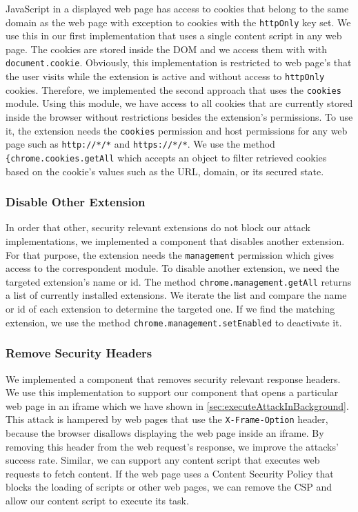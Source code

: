 	JavaScript in a displayed web page has access to cookies that belong to the same domain as the web page with exception to cookies with the \texttt{httpOnly} key set. We use this in our first implementation that uses a single content script in any web page. The cookies are stored inside the DOM and we access them with with \texttt{document.cookie}. Obviously, this implementation is restricted to web page's that the user visits while the extension is active and without access to \texttt{httpOnly} cookies. Therefore, we implemented the second approach that uses the \texttt{cookies} module. Using this module, we have access to all cookies that are currently stored inside the browser without restrictions besides the extension's permissions. To use it, the extension needs the \texttt{cookies} permission and host permissions for any web page such as \texttt{http://*/*} and \texttt{https://*/*}. We use the method \lstinline|{chrome.cookies.getAll| which accepts an object to filter retrieved cookies based on the cookie's values such as the URL, domain, or its secured state.

\subsubsection{Disable Other Extension}
\label{sec:disableOtherExtension}

	In order that other, security relevant extensions do not block our attack implementations, we implemented a component that disables another extension. For that purpose, the extension needs the \texttt{management} permission which gives access to the correspondent module. To disable another extension, we need the targeted extension's name or id.
	The method \lstinline|chrome.management.getAll| returns a list of currently installed extensions. We iterate the list and compare the name or id of each extension to determine the targeted one. If we find the matching extension, we use the method \lstinline|chrome.management.setEnabled| to deactivate it.

\subsubsection{Remove Security Headers}
\label{sec:removeSecurityHeaders}
	
	We implemented a component that removes security relevant response headers. We use this implementation to support our component that opens a particular web page in an iframe which we have shown in \autoref{sec:executeAttackInBackground}. This attack is hampered by web pages that use the \texttt{X-Frame-Option} header, because the browser disallows displaying the web page inside an iframe. By removing this header from the web request's response, we improve the attacks' success rate. Similar, we can support any content script that executes web requests to fetch content. If the web page uses a Content Security Policy that blocks the loading of scripts or other web pages, we can remove the CSP and allow our content script to execute its task.
	
